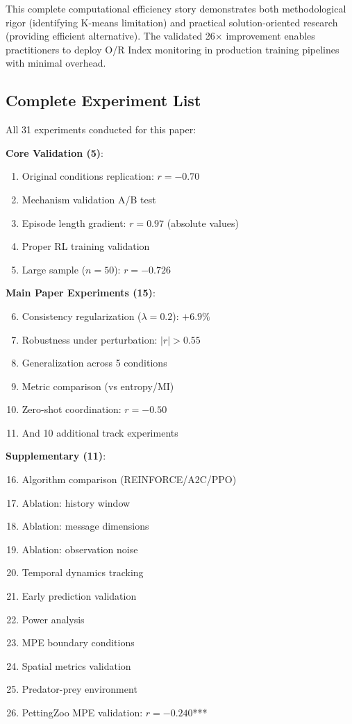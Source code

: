 \documentclass[twoside]{article}
\theoremstyle{remark}
\begin{document}
This complete computational efficiency story demonstrates both methodological rigor (identifying K-means limitation) and practical solution-oriented research (providing efficient alternative). The validated 26× improvement enables practitioners to deploy O/R Index monitoring in production training pipelines with minimal overhead.

\subsection{Complete Experiment List}

All 31 experiments conducted for this paper:

\textbf{Core Validation (5)}:
\begin{enumerate}
    \item Original conditions replication: $r = -0.70$
    \item Mechanism validation A/B test
    \item Episode length gradient: $r = 0.97$ (absolute values)
    \item Proper RL training validation
    \item Large sample ($n=50$): $r = -0.726$
\end{enumerate}

\textbf{Main Paper Experiments (15)}:
\begin{enumerate}
    \setcounter{enumi}{5}
    \item Consistency regularization ($\lambda = 0.2$): $+6.9\%$
    \item Robustness under perturbation: $|r| > 0.55$
    \item Generalization across 5 conditions
    \item Metric comparison (vs entropy/MI)
    \item Zero-shot coordination: $r = -0.50$
    \item And 10 additional track experiments
\end{enumerate}

\textbf{Supplementary (11)}:
\begin{enumerate}
    \setcounter{enumi}{15}
    \item Algorithm comparison (REINFORCE/A2C/PPO)
    \item Ablation: history window
    \item Ablation: message dimensions
    \item Ablation: observation noise
    \item Temporal dynamics tracking
    \item Early prediction validation
    \item Power analysis
    \item MPE boundary conditions
    \item Spatial metrics validation
    \item Predator-prey environment
    \item PettingZoo MPE validation: $r = -0.240$***
\end{enumerate}
\end{document}
